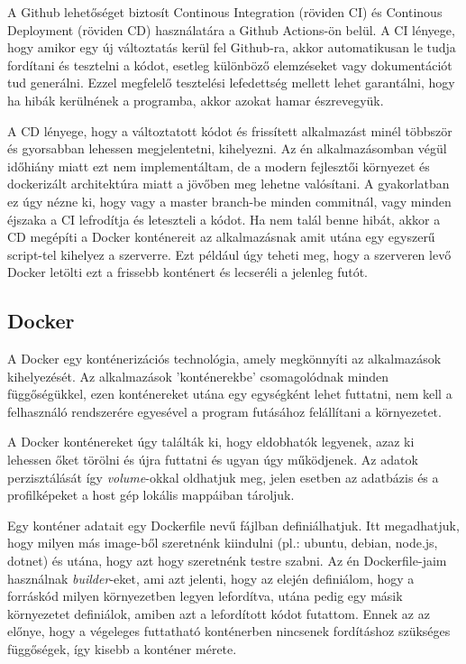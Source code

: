 A Github lehetőséget biztosít Continous Integration (röviden CI) és Continous Deployment (röviden CD) használatára a Github Actions-ön belül. A CI lényege, hogy amikor egy új változtatás kerül fel Github-ra, akkor automatikusan le tudja fordítani és tesztelni a kódot, esetleg különböző elemzéseket vagy dokumentációt tud generálni. Ezzel megfelelő tesztelési lefedettség mellett lehet garantálni, hogy ha hibák kerülnének a programba, akkor azokat hamar észrevegyük.

A CD lényege, hogy a változtatott kódot és frissített alkalmazást minél többször és gyorsabban lehessen megjelentetni, kihelyezni. Az én alkalmazásomban végül időhiány miatt ezt nem implementáltam, de a modern fejlesztői környezet és dockerizált architektúra miatt a jövőben meg lehetne valósítani. A gyakorlatban ez úgy nézne ki, hogy vagy a master branch-be minden commitnál, vagy minden éjszaka a CI lefrodítja és leteszteli a kódot. Ha nem talál benne hibát, akkor a CD megépíti a Docker konténereit az alkalmazásnak amit utána egy egyszerű script-tel kihelyez a szerverre. Ezt például úgy teheti meg, hogy a szerveren levő Docker letölti ezt a frissebb konténert és lecseréli a jelenleg futót.

\subsection{Docker}
A Docker egy konténerizációs technológia, amely megkönnyíti az alkalmazások kihelyezését. Az alkalmazások 'konténerekbe' csomagolódnak minden függőségükkel, ezen konténereket utána egy egységként lehet futtatni, nem kell a felhasználó rendszerére egyesével a program futásához felállítani a környezetet.

A Docker konténereket úgy találták ki, hogy eldobhatók legyenek, azaz ki lehessen őket törölni és újra futtatni és ugyan úgy működjenek. Az adatok perzisztálását így \textit{volume}-okkal oldhatjuk meg, jelen esetben az adatbázis és a profilképeket a host gép lokális mappáiban tároljuk.

Egy konténer adatait egy Dockerfile nevű fájlban definiálhatjuk. Itt megadhatjuk, hogy milyen más image-ből szeretnénk kiindulni (pl.: ubuntu, debian, node.js, dotnet) és utána, hogy azt hogy szeretnénk testre szabni. Az én Dockerfile-jaim használnak \textit{builder}-eket, ami azt jelenti, hogy az elején definiálom, hogy a forráskód milyen környezetben legyen lefordítva, utána pedig egy másik környezetet definiálok, amiben azt a lefordított kódot futattom. Ennek az az előnye, hogy a végeleges futtatható konténerben nincsenek fordításhoz szükséges függőségek, így kisebb a konténer mérete.

